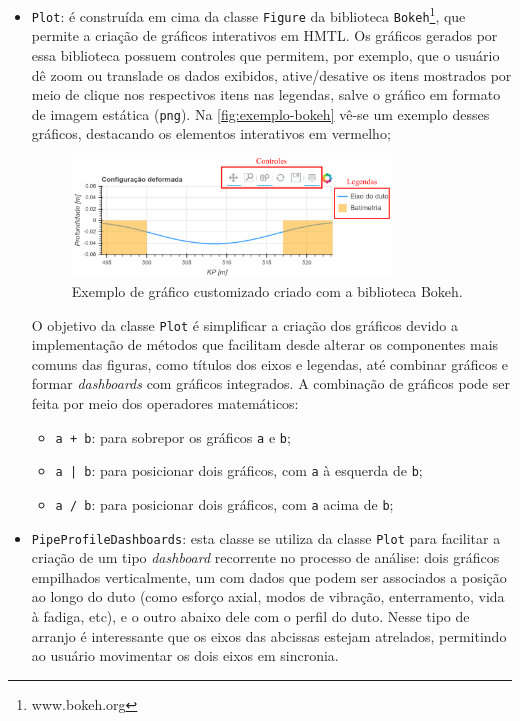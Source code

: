 \begin{itemize}

    \item \texttt{Plot}: é construída em cima da classe \texttt{Figure} da biblioteca \texttt{Bokeh}\footnote{www.bokeh.org}, que permite a criação de gráficos interativos em HMTL. Os gráficos gerados por essa biblioteca possuem controles que permitem, por exemplo, que o usuário dê zoom ou translade os dados exibidos, ative/desative os itens mostrados por meio de clique nos respectivos itens nas legendas, salve o gráfico em formato de imagem estática (\texttt{png}). Na \autoref{fig:exemplo-bokeh} vê-se um exemplo desses gráficos, destacando os elementos interativos em vermelho;

    \begin{figure}[!ht]
        \centering
        \caption{Exemplo de gráfico customizado criado com a biblioteca Bokeh.}\label{fig:exemplo-bokeh}
        \includegraphics[width=0.8\textwidth]{imagens/exemplo-bokeh}
    \end{figure}

    O objetivo da classe \texttt{Plot} é simplificar a criação dos gráficos devido a implementação de métodos que facilitam desde alterar os componentes mais comuns das figuras, como títulos dos eixos e legendas, até combinar gráficos e formar \textit{dashboards} com gráficos integrados. A combinação de gráficos pode ser feita por meio dos operadores matemáticos:
    \begin{itemize}
        \item \texttt{a + b}: para sobrepor os gráficos \texttt{a} e \texttt{b};
        \item \texttt{a | b}: para posicionar dois gráficos, com \texttt{a} à esquerda de \texttt{b};
        \item \texttt{a / b}: para posicionar dois gráficos, com \texttt{a} acima de \texttt{b};
    \end{itemize}

    \item \texttt{PipeProfileDashboards}: esta classe se utiliza da classe \texttt{Plot} para facilitar a criação de um tipo \textit{dashboard} recorrente no processo de análise: dois gráficos empilhados verticalmente, um com dados que podem ser associados a posição ao longo do duto (como esforço axial, modos de vibração, enterramento, vida à fadiga, etc), e o outro abaixo dele com o perfil do duto. Nesse tipo de arranjo é interessante que os eixos das abcissas estejam atrelados, permitindo ao usuário movimentar os dois eixos em sincronia.
\end{itemize}

